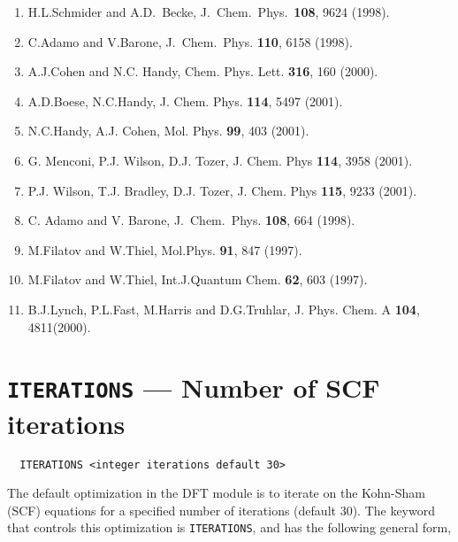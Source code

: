 {\begin{enumerate}
\item  H.L.Schmider and A.D.~Becke, J.~Chem.~Phys.~{\bf 108},
9624 (1998). \\
\item C.Adamo and V.Barone, J.~Chem.~Phys. {\bf 110}, 6158 (1998).\\
\item  A.J.Cohen and N.C. Handy, Chem. Phys. Lett. {\bf 316}, 160 (2000).\\
\item  A.D.Boese,  N.C.Handy, J. Chem. Phys. {\bf 114}, 5497
(2001). \\
\item  N.C.Handy, A.J. Cohen, Mol. Phys. {\bf 99}, 403 (2001).\\
\item G. Menconi, P.J. Wilson, D.J. Tozer, 
J. Chem. Phys {\bf 114}, 3958 (2001).\\
\item  P.J. Wilson, T.J. Bradley, D.J. Tozer, J. Chem. Phys {\bf 115}, 
9233 (2001).\\
\item C. Adamo and V. Barone, J.~Chem.~Phys. {\bf 108}, 664 (1998).\\
\item M.Filatov and W.Thiel, Mol.Phys. {\bf 91}, 847 (1997).\\
\item M.Filatov and W.Thiel, Int.J.Quantum Chem. {\bf 62}, 603 (1997).\\
\item B.J.Lynch, P.L.Fast, M.Harris and D.G.Truhlar, J. Phys. Chem. A
{\bf 104}, 4811(2000).\\
\end{enumerate}
}
\onecolumn

\section{{\tt ITERATIONS} --- Number of SCF iterations}

\begin{verbatim}
  ITERATIONS <integer iterations default 30>
\end{verbatim}

The default optimization in the DFT module is to iterate on the 
Kohn-Sham (SCF) equations for a specified number of iterations
(default 30).  The keyword that controls this optimization 
is \verb+ITERATIONS+, and has the following general form,

